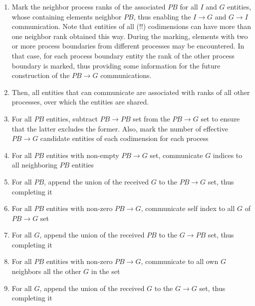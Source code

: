 \begin{mybox}
\begin{enumerate}
	\item Mark the neighbor process ranks of the associated $PB$ for all $I$ and $G$ entities, whose containing elements neighbor $PB$, thus enabling the $I \rightarrow G$ and $G \rightarrow I$ communication. Note that entities of all (!!) codimensions can have more than one neighbor rank obtained this way. During the marking, elements with two or more process boundaries from different processes may be encountered. In that case, for each process boundary entity the rank of the other process boundary is marked, thus providing some information for the future construction of the $PB \rightarrow G$ communications.
	\item Then, all entities that can communicate are associated with ranks of all other processes, over which the entities are shared.%
	\item For all $PB$ entities, subtract $PB\rightarrow PB$ set from the $PB \rightarrow G$ set to ensure that the latter excludes the former. Also, mark the number of effective $PB \rightarrow G$ candidate entities of each codimension for each process
	\item For all $PB$ entities with non-empty $PB \rightarrow G$ set, communicate $G$ indices to all neighboring $PB$ entities
	\item For all $PB$, append the union of the received $G$ to the $PB \rightarrow G$ set, thus completing it %
	\item For all $PB$ entities with non-zero $PB \rightarrow G$, communicate self index to all $G$ of $PB \rightarrow G$ set
	\item For all $G$, append the union of the received $PB$ to the $G \rightarrow PB$ set, thus completing it %
	\item For all $PB$ entities with non-zero $PB \rightarrow G$, communicate to all own $G$ neighbors all the other $G$ in the set
	\item For all $G$, append the union of the received $G$ to the $G \rightarrow G$ set, thus completing it %
\end{enumerate}
\end{mybox}



